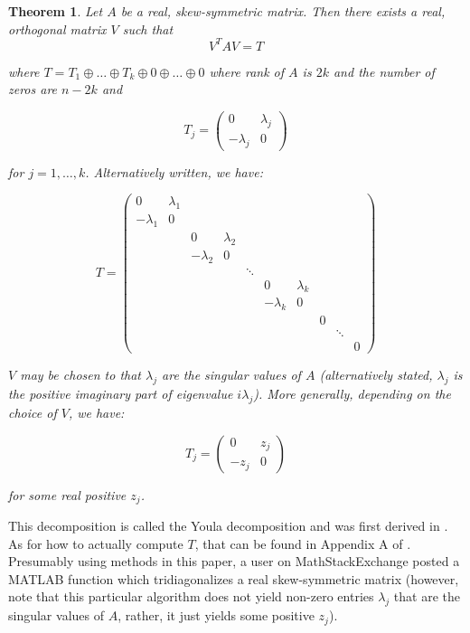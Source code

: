 \documentclass[a4,11pt,twoside,leqno]{report}
\newtheorem{thm}{Theorem}[section]
\theoremstyle{definition}
\theoremstyle{remark}
\numberwithin{equation}{section}
\begin{document}
\begin{thm} Let $A$ be a real, skew-symmetric matrix. Then there exists a real, orthogonal matrix $V$ such that 
$$V^TAV=T$$

where $T=T_1 \oplus \dots \oplus T_k \oplus 0\oplus \dots \oplus 0$  where rank of $A$ is $2k$ and the number of zeros are $n-2k$ and 

$$T_j=\begin{pmatrix} 0 & \lambda_j \\ -\lambda_j & 0 \end{pmatrix}$$

for $j=1, \dots, k$. Alternatively written, we have:

$$T=\begin{pmatrix} 0 & \lambda_1\\ -\lambda_1 & 0 \\ &  & 0 & \lambda_2 \\ & & -\lambda_2 & 0 \\ & & & & \ddots \\ & & & & & 0 & \lambda_k \\ & & &  & & -\lambda_k & 0 \\ & & & & & & & 0 \\ & & & & & & & & \ddots \\ & & &  & & & &  & & 0  \end{pmatrix}$$ 


 $V$ may be chosen to that $\lambda_j$ are the singular values of $A$ (alternatively stated, $\lambda_j$ is the positive imaginary part of eigenvalue $i\lambda_j$). More generally, depending on the choice of $V$, we have:

$$T_j=\begin{pmatrix} 0 & z_j \\ -z_j & 0 \end{pmatrix}$$

for some real positive $z_j$.

\end{thm}

This decomposition is called the Youla decomposition and was first derived in \cite{youla}. As for how to actually compute $T$, that can be found in Appendix A of \cite{wimmer}. Presumably using methods in this paper, a user on MathStackExchange posted \cite{chip} a MATLAB function which tridiagonalizes a real skew-symmetric matrix (however, note that this particular algorithm does not yield non-zero entries $\lambda_j$ that are the singular values of $A$, rather, it just yields some positive $z_j$).
\end{document}
